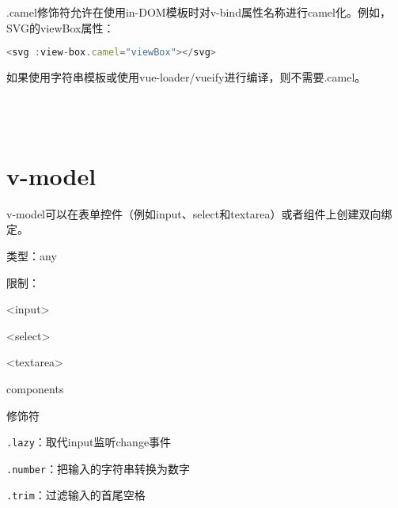 \begin{compactitem}
\item .camel修饰符允许在使用in-DOM模板时对v-bind属性名称进行camel化。例如，SVG的viewBox属性：

\begin{lstlisting}[language=JavaScript]
<svg :view-box.camel="viewBox"></svg>
\end{lstlisting}


\item 如果使用字符串模板或使用vue-loader/vueify进行编译，则不需要.camel。
\end{compactitem}



\begin{lstlisting}[language=JavaScript]

\end{lstlisting}




\begin{lstlisting}[language=JavaScript]

\end{lstlisting}




\begin{lstlisting}[language=JavaScript]

\end{lstlisting}




\begin{lstlisting}[language=JavaScript]

\end{lstlisting}


\chapter{v-model}

v-model可以在表单控件（例如input、select和textarea）或者组件上创建双向绑定。


\begin{compactitem}
\item 类型：any
\item 限制：

\begin{compactenum}
\item <input>
\item <select>
\item <textarea>
\item components
\end{compactenum}

\item 修饰符

\begin{compactenum}
\item \texttt{.lazy}：取代input监听change事件
\item \texttt{.number}：把输入的字符串转换为数字
\item \texttt{.trim}：过滤输入的首尾空格
\end{compactenum}

\end{compactitem}



